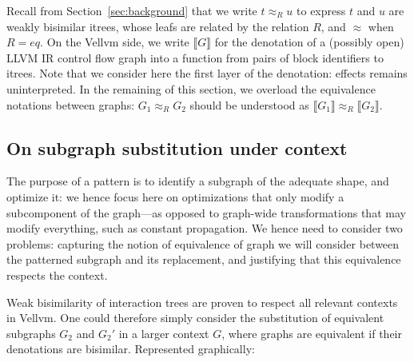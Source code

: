 \documentclass[11pt]{article}
\newcommand{\yz}[1]{\textcolor{ForestGreen}{#1}}
\newcommand{\yzt}[1]{\textcolor{ForestGreen!50}{#1}}
\begin{document}
Recall from Section~\ref{sec:background} that we write $t \approx_R u$ to express $t$ and $u$ are weakly bisimilar itrees, whose leafs are related by the relation $R$, and $\approx$ when $R=eq$. On the Vellvm side, we write $\llbracket G \rrbracket$ for the denotation of a (possibly open) LLVM IR control flow graph into a function from pairs of block identifiers to itrees. Note that we consider here the first layer of the denotation: effects remains uninterpreted.
In the remaining of this section, we overload the equivalence notations between graphs: $G_1 \approx_R G_2$ should be understood as $\llbracket G_1\rrbracket \approx_R \llbracket G_2\rrbracket$.

\subsection{On subgraph substitution under context}

The purpose of a pattern is to identify a subgraph of the adequate shape, and optimize it: we hence focus here on optimizations that only modify a subcomponent of the graph---as opposed to graph-wide transformations that may modify everything, such as constant propagation. We hence need to consider two problems: capturing the notion of equivalence of graph we will consider between the patterned subgraph and its replacement, and justifying that this equivalence respects the context.




\yzt{Weak bisimilarity of interaction trees are proven to respect all relevant contexts in Vellvm. One could therefore simply consider the substitution of equivalent subgraphs $G_2$ and $G_2'$ in a larger context $G$, where graphs are equivalent if their denotations are bisimilar. Represented graphically:}
\end{document}
